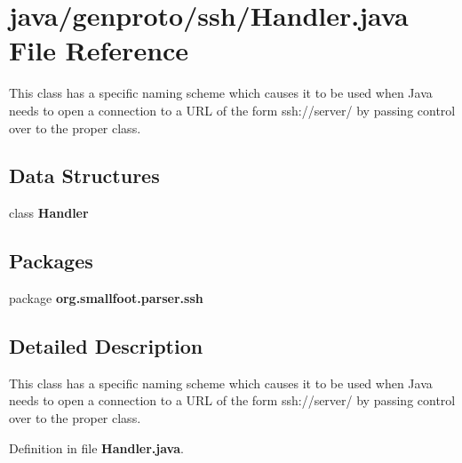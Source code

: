 \section{java/genproto/ssh/\+Handler.java File Reference}
\label{ssh_2Handler_8java}


This class has a specific naming scheme which causes it to be used when Java needs to open a connection to a U\+R\+L of the form ssh\+://server/ by passing control over to the proper class.  


\subsection*{Data Structures}
\begin{DoxyCompactItemize}
\item 
class {\bf Handler}
\end{DoxyCompactItemize}
\subsection*{Packages}
\begin{DoxyCompactItemize}
\item 
package {\bf org.\+smallfoot.\+parser.\+ssh}
\end{DoxyCompactItemize}


\subsection{Detailed Description}
This class has a specific naming scheme which causes it to be used when Java needs to open a connection to a U\+R\+L of the form ssh\+://server/ by passing control over to the proper class. 



Definition in file {\bf Handler.\+java}.

